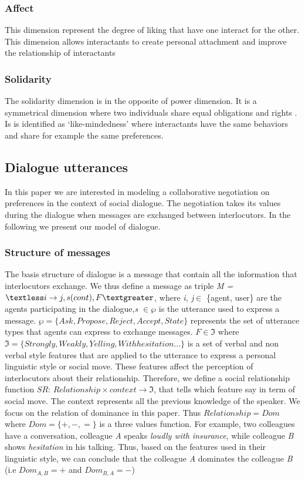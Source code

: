 \documentclass{llncs}
\begin{document}
\subsubsection{Affect}
This dimension represent the degree of liking that have one interact for the other. This dimension allows interactants to create personal attachment and improve the relationship of interactants \cite{nicholson2001role}
\subsubsection{Solidarity}
The solidarity dimension is in the opposite of power dimension. It is a symmetrical dimension where two individuals share equal obligations and rights \cite{svennevig2000getting}. Is is identified as ‘like-mindedness’ \cite{bickmore2005establishing} where interactants have the same behaviors and share for example the same preferences.
\subsection{Dialogue utterances}
In this paper we are interested in  modeling a collaborative negotiation on preferences in the context of social dialogue. The negotiation takes its values during the dialogue when messages are exchanged between interlocutors. In the following we present our model of dialogue.
\subsubsection{Structure of messages}
The basis structure of dialogue is a message that contain all the information that interlocutors exchange. We thus define a message as triple \emph{M = $\textless i \rightarrow j, s(cont), F  \textgreater$}, where \emph{i, j}$\in$ \{agent, user\} are the agents participating in the dialogue,\emph{s $\in \wp$}  is the utterance used to express a message. $\wp = \{ Ask, Propose, Reject, Accept, State\}$  represents the set of utterance types \cite{searle1969speech} that agents can express to exchange messages. 
 $F \in \Im $  where $\Im = \{ Strongly, Weakly, Yelling, With hesitation ...\}$ is a set of verbal and non verbal style features that are applied to the utterance to express a personal linguistic style or social move. These features affect the perception of interlocutors about their relationship. Therefore, we define a social relationship function $SR$: $Relationship \times context \rightarrow \Im $, that tells which feature say in term of social move. The context represents all the previous knowledge of the speaker. We focus on the relation of dominance in this paper. Thus $Relationship = Dom$ where  $Dom = \{+, -, =\}$ is a three values function. For example, two colleagues have a conversation, colleague \emph{A} speaks \textit{loudly with insurance}, while colleague \emph{B} shows \textit{hesitation} in his talking. Thus, based on the features used in their linguistic style, we can conclude that the colleague \emph{A}  dominates  the colleague \emph{B} (i.e $Dom_{A,B} = +$ and $Dom_{B,A} = -$)
 
\end{document}
